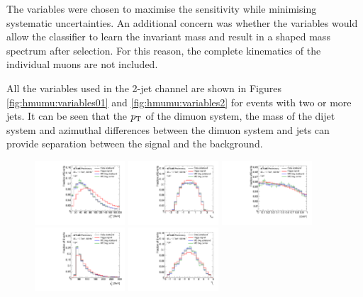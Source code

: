 The variables were chosen to maximise the sensitivity while
minimising systematic uncertainties. An additional concern was
whether the variables would allow the classifier to learn the
invariant mass and result in a shaped mass spectrum after selection.
For this reason, the complete kinematics of the individual muons
are not included.

All the variables used in the 2-jet channel are shown in Figures
\ref{fig:hmumu:variables01} and \ref{fig:hmumu:variables2} for
events with two or more jets. It can be seen that the $p_{\text{T}}$ of
the dimuon system, the mass of the dijet system and azimuthal
differences between the dimuon system and jets can provide
separation between the signal and the background.

\begin{figure}[h!]
  \centering
  \includegraphics[width=0.3\textwidth]{figures/hmumu/vars/Z_PT_FSR}
  \includegraphics[width=0.3\textwidth]{figures/hmumu/vars/Z_Y_FSR}
  \includegraphics[width=0.3\textwidth]{figures/hmumu/vars/CosThetaStar} \\ 
  \includegraphics[width=0.3\textwidth]{figures/hmumu/vars/Jets_PT_Lead}
  \includegraphics[width=0.3\textwidth]{figures/hmumu/vars/Jets_Eta_Lead}

\end{figure}
